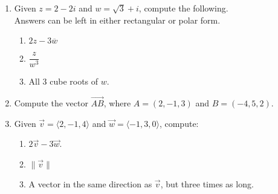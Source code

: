 \documentclass[12pt]{article}
\newcommand{\len}[1]{\lVert #1\rVert}
\begin{document}
  \begin{enumerate}
    \item Given $z=2-2i$ and $w=\sqrt{3}+i$, compute the following.\\ Answers can be left in either rectangular or polar form.
    \begin{enumerate}
	\item $2z-3\overline{w}$
	
	\vspace{0.55in}
	
       
    \item $\dfrac{z}{w^3}$
    
    \vspace{1in}
    
    \item All 3 cube roots of $w$.
    
    \vspace{1.75in}
    \end{enumerate}
    
    \item Compute the vector $\overrightarrow{AB}$, where $A=(2,-1,3)$ and $B=(-4,5,2)$.
    
    \vspace{1in}
    
    \item Given $\vec{v} = \langle 2,-1,4\rangle$ and $\vec{w} = \langle -1,3,0\rangle$, compute:
    \begin{enumerate}
    \item $2\vec{v}-3\vec{w}$.
    
    \vspace{1cm}
    
    \item $\len{\vec{v}}$
    
    \vspace{1cm}
    
    \item A vector in the same direction as $\vec{v}$, but three times as long.
\end{enumerate}     
\end{enumerate}
  
\end{document}
